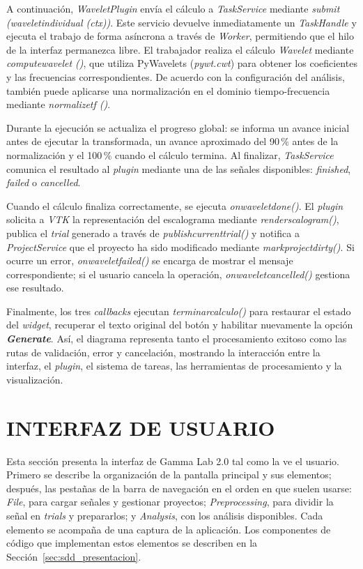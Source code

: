 \documentclass[12pt,letterpaper,oneside]{article}
\DeclareRobustCommand{\_}{\textunderscore\allowbreak}
\newcommand{\capitulo}[1]{\clearpage\section{#1}}
\begin{document}
A continuación, \textit{WaveletPlugin} envía el cálculo a \textit{TaskService} mediante \textit{submit (wavelet\_\allowbreak individual (ctx))}. Este servicio devuelve inmediatamente un \textit{TaskHandle} y ejecuta el trabajo de forma asíncrona a través de \textit{\textunderscore{}Worker}, permitiendo que el hilo de la interfaz permanezca libre. El trabajador realiza el cálculo \textit{Wavelet} mediante \textit{compute\_\allowbreak wavelet ()}, que utiliza PyWavelets (\textit{pywt.cwt}) para obtener los coeficientes y las frecuencias correspondientes. De acuerdo con la configuración del análisis, también puede aplicarse una normalización en el dominio tiempo-frecuencia mediante \textit{normalize\_\allowbreak tf ()}.

Durante la ejecución se actualiza el progreso global: se informa un avance inicial antes de ejecutar la transformada, un avance aproximado del 90\,\% antes de la normalización y el 100\,\% cuando el cálculo termina. Al finalizar, \textit{TaskService} comunica el resultado al \textit{plugin} mediante una de las señales disponibles: \textit{finished}, \textit{failed} o \textit{cancelled}.

Cuando el cálculo finaliza correctamente, se ejecuta \textit{\textunderscore{}on\_wavelet\_done()}. El \textit{plugin} solicita a \textit{VTK} la representación del escalograma mediante \textit{render\_scalogram()}, publica el \textit{trial} generado a trav\'es de \textit{publish\_current\_trial()} y notifica a \textit{ProjectService} que el proyecto ha sido modificado mediante \textit{mark\_project\_dirty()}. Si ocurre un error, \textit{\textunderscore{}on\_wavelet\_failed()} se encarga de mostrar el mensaje correspondiente; si el usuario cancela la operación, \textit{\textunderscore{}on\_wavelet\_cancelled()} gestiona ese resultado.

Finalmente, los tres \textit{callbacks} ejecutan \textit{\textunderscore{}terminar\_calculo()} para restaurar el estado del \textit{widget}, recuperar el texto original del botón y habilitar nuevamente la opción \textbf{\textit{Generate}}. Así, el diagrama representa tanto el procesamiento exitoso como las rutas de validación, error y cancelación, mostrando la interacción entre la interfaz, el \textit{plugin}, el sistema de tareas, las herramientas de procesamiento y la visualización.

\capitulo{INTERFAZ DE USUARIO}
\label{sec:sdd_interfaz}

Esta sección presenta la interfaz de Gamma Lab 2.0 tal como la ve el usuario. Primero se describe la organización de la pantalla principal y sus elementos; después, las pestañas de la barra de navegación en el orden en que suelen usarse: \textit{File}, para cargar señales y gestionar proyectos; \textit{Preprocessing}, para dividir la señal en \textit{trials} y prepararlos; y \textit{Analysis}, con los análisis disponibles. Cada elemento se acompaña de una captura de la aplicación. Los componentes de código que implementan estos elementos se describen en la Sección~\ref{sec:sdd_presentacion}.
\end{document}
